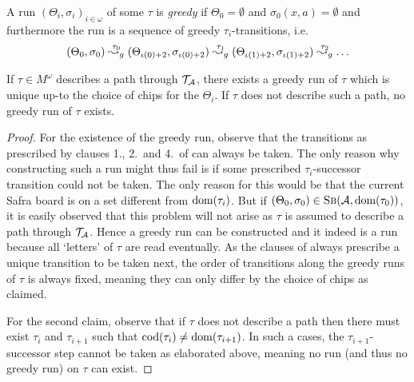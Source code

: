 \begin{definition}\label{def:greedy}
  A run $(\Theta_i, \sigma_i)_{i \in \omega}$ of some $\tau$ is \emph{greedy} if
  $\Theta_0 = \emptyset$ and $\sigma_0(x, a) = \emptyset$ and furthermore the
  run is a sequence of greedy $\tau_i$-transitions, i.e.
  \[(\Theta_0, \sigma_0) \stackrel{\tau_0}{\leadsto_g} (\Theta_{\iota(0) + 2}, \sigma_{\iota(0)
    + 2}) \stackrel{\tau_1}{\leadsto_g} (\Theta_{\iota(1) + 2}, \sigma_{\iota(1) + 2})
  \stackrel{\tau_2}{\leadsto_g} \ldots\]
\end{definition}
\begin{fact}\label{lem:greedy-unique}
  If $\tau \in M^\omega$ describes a path through $\mathcal{T}_{\mathcal{A}}$, there exists
  a greedy run of $\tau$ which is unique up-to the choice of chips for the
  $\Theta_i$. If $\tau$ does not describe such a path, no greedy run of $\tau$
  exists.
\end{fact}
\begin{proof}
  For the existence of the greedy run, observe that the transitions as prescribed by clauses 1., 2.~and 4.~of
   can always be taken. The only reason why constructing
  such a run might thus fail is if some prescribed $\tau_i$-successor transition could not
  be taken. The only reason for this would be that the current Safra board is on
  a set different from $\mathrm{dom}(\tau_i)$. But if $(\Theta_0, \sigma_0) \in \textsc{Sb}(\mathcal{A},
  \mathrm{dom}(\tau_0))$, it is easily observed that this problem will not arise as $\tau$
  is assumed to describe a path through $\mathcal{T}_{\mathcal{A}}$. Hence a greedy run can be
  constructed and it indeed is a run because all `letters' of $\tau$ are read
  eventually. As the clauses of  always prescribe a unique
  transition to be taken next, the order of transitions along the greedy runs of
  $\tau$ is always fixed, meaning they can only differ by the choice of chips as
  claimed.
  
  For the second claim, observe that if $\tau$ does not describe a path then
  there must exist $\tau_i$ and $\tau_{i + 1}$ such that $\mathrm{cod}(\tau_{i})
  \neq \mathrm{dom}(\tau_{i + 1})$. In such a cases, the $\tau_{i + 1}$-successor step
  cannot be taken as elaborated above, meaning no run (and thus no greedy run)
  on $\tau$ can exist.
\end{proof}


